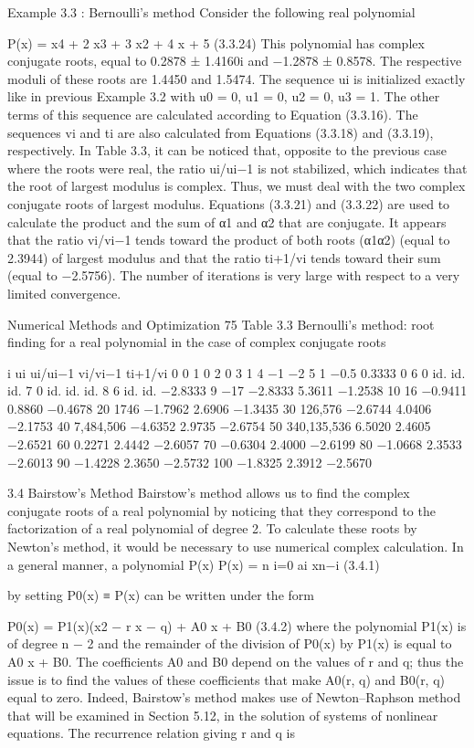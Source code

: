 \documentclass[letterpaper,12pt]{article}
\begin{document}
Example 3.3 :
Bernoulli’s method
Consider the following real polynomial

P(x) = x4 + 2 x3 + 3 x2 + 4 x + 5 (3.3.24)
This polynomial has complex conjugate roots, equal to 0.2878 ± 1.4160i and −1.2878 ± 0.8578. The
respective moduli of these roots are 1.4450 and 1.5474.
The sequence {ui } is initialized exactly like in previous Example 3.2 with u0 = 0, u1 = 0, u2 = 0,
u3 = 1. The other terms of this sequence are calculated according to Equation (3.3.16). The sequences
{vi } and {ti } are also calculated from Equations (3.3.18) and (3.3.19), respectively. In Table 3.3, it
can be noticed that, opposite to the previous case where the roots were real, the ratio ui/ui−1 is not
stabilized, which indicates that the root of largest modulus is complex. Thus, we must deal with the
two complex conjugate roots of largest modulus. Equations (3.3.21) and (3.3.22) are used to calculate
the product and the sum of α1 and α2 that are conjugate. It appears that the ratio vi/vi−1 tends toward
the product of both roots (α1α2) (equal to 2.3944) of largest modulus and that the ratio ti+1/vi tends
toward their sum (equal to −2.5756). The number of iterations is very large with respect to a very
limited convergence.

Numerical Methods and Optimization 75
Table 3.3 Bernoulli’s method: root finding for a real polynomial in the case of complex conjugate
roots

i ui ui/ui−1 vi/vi−1 ti+1/vi
0 0
1 0
2 0
3 1
4 −1 −2
5 1 −0.5 0.3333 0
6 0 id. id. id.
7 0 id. id. id.
8 6 id. id. −2.8333
9 −17 −2.8333 5.3611 −1.2538
10 16 −0.9411 0.8860 −0.4678
20 1746 −1.7962 2.6906 −1.3435
30 126,576 −2.6744 4.0406 −2.1753
40 7,484,506 −4.6352 2.9735 −2.6754
50 340,135,536 6.5020 2.4605 −2.6521
60 0.2271 2.4442 −2.6057
70 −0.6304 2.4000 −2.6199
80 −1.0668 2.3533 −2.6013
90 −1.4228 2.3650 −2.5732
100 −1.8325 2.3912 −2.5670

3.4 Bairstow’s Method
Bairstow’s method allows us to find the complex conjugate roots of a real polynomial
by noticing that they correspond to the factorization of a real polynomial of degree 2.
To calculate these roots by Newton’s method, it would be necessary to use numerical
complex calculation.
In a general manner, a polynomial P(x)
P(x) =
n
i=0
ai xn−i (3.4.1)

by setting P0(x) ≡ P(x) can be written under the form

P0(x) = P1(x)(x2 − r x − q) + A0 x + B0 (3.4.2)
where the polynomial P1(x) is of degree n − 2 and the remainder of the division of
P0(x) by P1(x) is equal to A0 x + B0. The coefficients A0 and B0 depend on the values
of r and q; thus the issue is to find the values of these coefficients that make A0(r, q)
and B0(r, q) equal to zero.
Indeed, Bairstow’s method makes use of Newton–Raphson method that will be
examined in Section 5.12, in the solution of systems of nonlinear equations. The
recurrence relation giving r and q is
\end{document}
